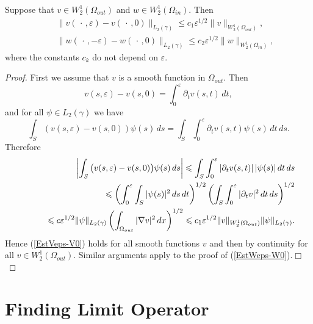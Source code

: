 \documentclass[graybox]{svmult}
\newcommand{\eps}{\varepsilon}
\renewcommand{\leq}{\leqslant}
\newcommand{\eqref}[1]{(\ref{#1})}
\begin{document}
\begin{proposition}\label{PropTrace}
  Suppose that $v\in W_2^{1}(\Omega_{out})$  and $w\in W_2^{1}(\Omega_{in})$. Then
\begin{eqnarray}\label{EstVeps-V0}
&&\|v(\,\cdot\,,\eps)-v(\,\cdot\,,0)\|_{L_2(\gamma)}\leq
c_1\eps^{1/2}\|v\|_{W_2^1(\Omega_{out})}, \\\label{EstWeps-W0} &&\|w(\,\cdot\,,-\eps)-w(\,\cdot\,,0)\|_{L_2(\gamma)}\leq
c_2\eps^{1/2}\|w\|_{W_2^1(\Omega_{in})},
\end{eqnarray}
where the constants $c_k$ do not depend on $\eps$.
\end{proposition}
\begin{proof}
  First we assume that $v$ is a smooth function in $\Omega_{out}$. Then
$$
 v(s,\eps)-v(s,0)=\int_0^\eps \partial_t v(s,t)\,dt,
$$
and for all $\psi\in L_2(\gamma)$ we have
$$
\int_S(v(s,\eps)-v(s,0))\psi(s)\,ds=\int_S\int_0^\eps\partial_t v(s,t)\psi(s)\,dt\,ds.
$$
Therefore
\begin{eqnarray}\nonumber
&&\left|\int_S\big(v(s,\eps)-v(s,0)\big)\psi(s)\,ds\right|\leq
\int_S\int_0^\eps|\partial_t v(s,t)|\,|\psi(s)|\,dt\,ds
\\\nonumber
&&\kern20pt\leq \left(\int_0^\eps \int_S|\psi(s)|^2\,ds\,dt\right)^{1/2}
\left(\int_S\int_0^\eps |\partial_t v|^2\,dt\,ds\right)^{1/2}
\\\nonumber
&&\kern20pt\leq c\eps^{1/2}\|\psi\|_{L_2(\gamma)}
\left(\int_{\Omega_{out}}|\nabla v|^2\,dx\right)^{1/2}\leq c_1\eps^{1/2}\|v\|_{W_2^1(\Omega_{out})}\|\psi\|_{L_2(\gamma)}.
\end{eqnarray}
Hence \eqref{EstVeps-V0} holds for all smooth functions $v$ and then by continuity for all $v\in W_2^{1}(\Omega_{out})$.
Similar arguments apply to the proof of \eqref{EstWeps-W0}.\hfill$\Box$
\end{proof}



\section{Finding Limit Operator}
\label{Sec:LimitOperator}
\end{document}
